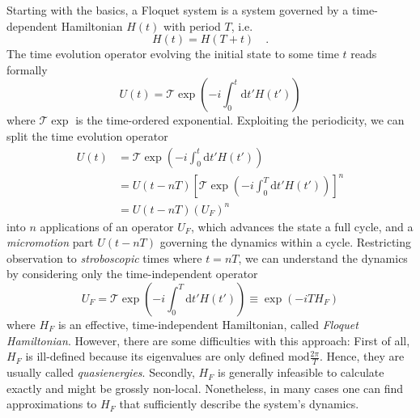 Starting with the basics, a Floquet system is a system governed by a time-dependent Hamiltonian $H(t)$ with period $T$, i.e. 
\begin{equation}
	H(t) = H(T+t)\quad.
\end{equation}
The time evolution operator evolving the initial state to some time $t$ reads formally
\begin{equation}
	U(t) = \mathcal{T}\exp(-i\int_0^t\!\mathrm{d}t'H(t'))
\end{equation}
where $\mathcal{T}\exp$ is the time-ordered exponential.
Exploiting the periodicity, we can split the time evolution operator
\begin{align}
	U(t) &= \mathcal{T}\exp(-i\int_0^t\!\mathrm{d}t'H(t'))\\
	&= U(t-nT)\left[\mathcal{T}\exp(-i\int_0^T\!\mathrm{d}t'H(t'))\right]^n\\
	&= U(t-nT) (U_F)^n
\end{align}
into $n$ applications of an operator $U_F$, which advances the state a full cycle, and a \emph{micromotion} part $U(t-nT)$ governing the dynamics within a cycle. Restricting observation to \emph{stroboscopic} times where $t=nT$, we can understand the dynamics by considering only the time-independent operator
\begin{equation}
	U_F = \mathcal{T}\exp(-i\int_0^T\!\mathrm{d}t'H(t')) \equiv \exp(-iTH_F)
\end{equation}
where $H_F$ is an effective, time-independent Hamiltonian, called \emph{Floquet Hamiltonian}. However, there are some difficulties with this approach: First of all, $H_F$ is ill-defined because its eigenvalues are only defined $\mathrm{mod} \frac{2\pi}{T}$. Hence, they are usually called \emph{quasienergies}. Secondly, $H_F$ is generally infeasible to calculate exactly and might be grossly non-local. Nonetheless, in many cases one can find approximations to $H_F$ that sufficiently describe the system's dynamics.

